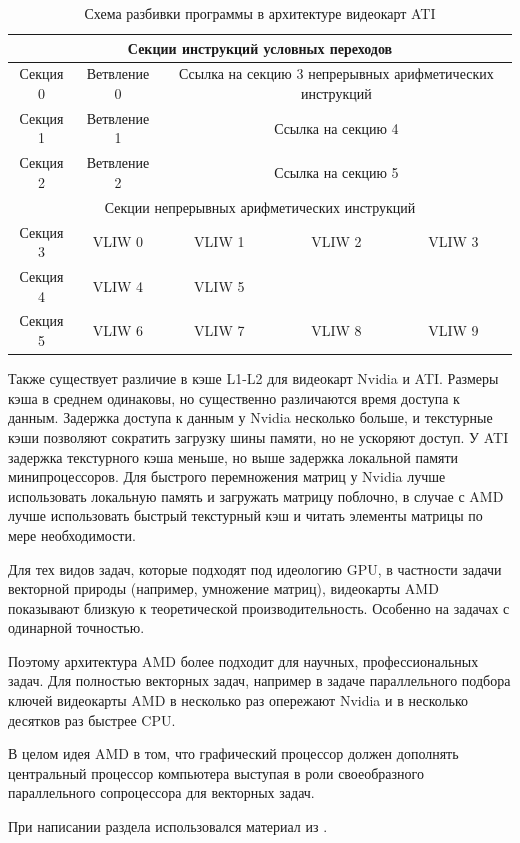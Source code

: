 \begin{table}
\begin{center}
\begin{tabular}{|c|c|c|c|c|}
\hline
\multicolumn{5}{|c|}{Секции инструкций условных переходов} \\
\hline
Секция 0 & Ветвление 0 & \multicolumn{3}{|p{7cm}|}{Ссылка на секцию 3 непрерывных арифметических инструкций} \\ \hline
Секция 1 & Ветвление 1 & \multicolumn{3}{|p{7cm}|}{Ссылка на секцию 4} \\ \hline
Секция 2 & Ветвление 2 & \multicolumn{3}{|p{7cm}|}{Ссылка на секцию 5} \\ \hline
\multicolumn{5}{|c|}{Секции непрерывных арифметических инструкций} \\ \hline
Секция 3 & VLIW 0 & VLIW 1 & VLIW 2 & VLIW 3 \\ \hline
Секция 4 & VLIW 4 & VLIW 5 & & \\ \hline
Секция 5 & VLIW 6 & VLIW 7 & VLIW 8 & VLIW 9 \\ \hline
\end{tabular}
\end{center}
\caption {Схема разбивки программы в архитектуре видеокарт ATI}
\end{table}

Также существует различие в кэше L1-L2 для видеокарт Nvidia и ATI. Размеры кэша в среднем одинаковы, но существенно различаются время доступа к данным. Задержка доступа к данным у Nvidia несколько больше, и текстурные кэши позволяют сократить загрузку шины памяти, но не ускоряют доступ. У ATI задержка текстурного кэша меньше, но выше задержка локальной памяти минипроцессоров. Для быстрого перемножения матриц у Nvidia лучше использовать локальную память и загружать матрицу поблочно, в случае с AMD лучше использовать быстрый текстурный кэш и читать элементы матрицы по мере необходимости.

Для тех видов задач, которые подходят под идеологию GPU, в частности задачи векторной природы (например, умножение матриц), видеокарты AMD показывают близкую к теоретической производительность. Особенно на задачах с одинарной точностью.

Поэтому архитектура AMD более подходит для научных, профессиональных задач. Для полностью векторных задач, например в задаче параллельного подбора ключей видеокарты AMD в несколько раз опережают Nvidia и в несколько десятков раз быстрее CPU.

В целом идея AMD в том, что графический процессор должен дополнять центральный процессор компьютера выступая в роли своеобразного параллельного сопроцессора для векторных задач.

При написании раздела использовался материал из \cite{amd}.
